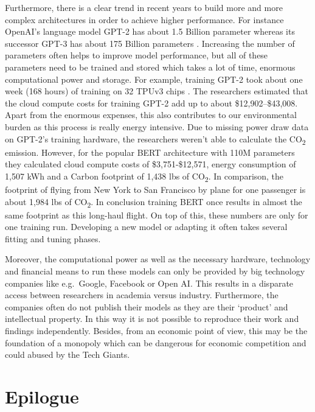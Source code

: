 \documentclass[
]{krantz}
\begin{document}
Furthermore, there is a clear trend in recent years to build more and more complex architectures in order to achieve higher performance. For instance OpenAI's language model GPT-2 has about 1.5 Billion parameter \citep{Radford2019LanguageMA} whereas its successor GPT-3 has about 175 Billion parameters \citep{GPT3}. Increasing the number of parameters often helps to improve model performance, but all of these parameters need to be trained and stored which takes a lot of time, enormous computational power and storage. For example, training GPT-2 took about one week (168 hours) of training on 32 TPUv3 chips \citep{environment}. The researchers \citet{environment} estimated that the cloud compute costs for training GPT-2 add up to about \$12,902--\$43,008. Apart from the enormous expenses, this also contributes to our environmental burden as this process is really energy intensive. Due to missing power draw data on GPT-2's training hardware, the researchers weren't able to calculate the CO\textsubscript{2} emission. However, for the popular BERT architecture with 110M parameters they calculated cloud compute costs of \$3,751-\$12,571, energy consumption of 1,507 kWh and a Carbon footprint of 1,438 lbs of CO\textsubscript{2}. In comparison, the footprint of flying from New York to San Francisco by plane for one passenger is about 1,984 lbs of CO\textsubscript{2}. In conclusion training BERT once results in almost the same footprint as this long-haul flight. On top of this, these numbers are only for one training run. Developing a new model or adapting it often takes several fitting and tuning phases.

Moreover, the computational power as well as the necessary hardware, technology and financial means to run these models can only be provided by big technology companies like e.g.~Google, Facebook or Open AI. This results in a disparate access between researchers in academia versus industry. Furthermore, the companies often do not publish their models as they are their `product' and intellectual property. In this way it is not possible to reproduce their work and findings independently. Besides, from an economic point of view, this may be the foundation of a monopoly which can be dangerous for economic competition and could abused by the Tech Giants.

\hypertarget{epilogue}{%
\chapter{Epilogue}\label{epilogue}}
\end{document}

